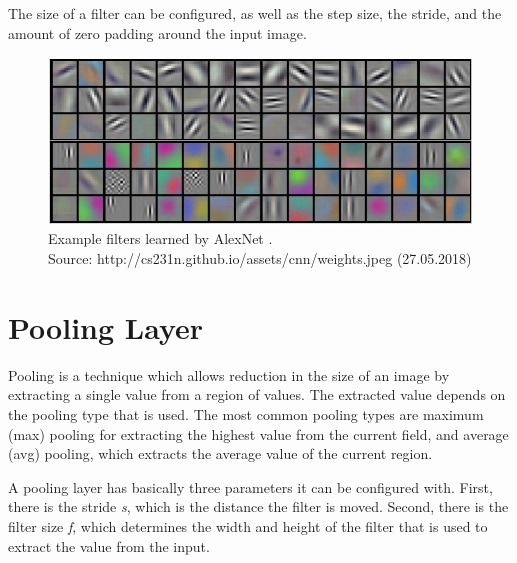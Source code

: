 The size of a filter can be configured, as well as the step size, the stride, and the amount of zero padding around the input image.

\begin{figure}[H]
    \centering
	\includegraphics[width=0.6\linewidth]{chapters/neural_networks/images/example_filters.jpeg}
	\caption{Example filters learned by AlexNet \cite{Krizhevsky.2012}.\\ Source: http://cs231n.github.io/assets/cnn/weights.jpeg (27.05.2018)}
	\label{fig:neural_networks:example_filters}
\end{figure}

\section{Pooling Layer}
Pooling is a technique which allows reduction in the size of an image by extracting a single value from a region of values. The extracted value depends on the pooling type that is used. The most common pooling types are maximum (max) pooling for extracting the highest value from the current field, and average (avg) pooling, which extracts the average value of the current region.

A pooling layer has basically three parameters it can be configured with. First, there is the stride \textit{s}, which is the distance the filter is moved. Second, there is the filter size \textit{f}, which determines the width and height of the filter that is used to extract the value from the input.

